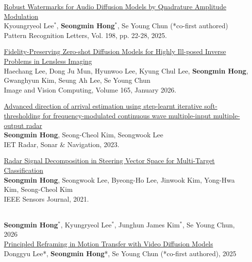 \begin{cvcontent}
\href{https://www.sciencedirect.com/science/article/pii/S0167865525003083}{Robust Watermarks for Audio Diffusion Models by Quadrature Amplitude Modulation}\\
Kyoungryeol Lee$^*$, \textbf{Seongmin Hong}$^*$, Se Young Chun (*co-first authored)\\
Pattern Recognition Letters, Vol. 198, pp. 22-28, 2025.

\href{https://doi.org/10.1016/j.imavis.2025.105786}{Fidelity-Preserving Zero-shot Diffusion Models for Highly Ill-posed Inverse Problems in Lensless Imaging}\\
Haechang Lee, Dong Ju Mun, Hyunwoo Lee, Kyung Chul Lee, \textbf{Seongmin Hong}, Gwanghyun Kim, Seung Ah Lee, Se Young Chun\\
Image and Vision Computing, Volume 165, January 2026.

\href{https://ietresearch.onlinelibrary.wiley.com/doi/10.1049/rsn2.12319}{Advanced direction of arrival estimation using step-learnt iterative soft-thresholding for frequency-modulated continuous wave multiple-input multiple-output radar}\\
\textbf{Seongmin Hong}, Seong-Cheol Kim, Seongwook Lee\\
IET Radar, Sonar \& Navigation, 2023.

\href{https://ieeexplore.ieee.org/abstract/document/9552897}{Radar Signal Decomposition in Steering Vector Space for Multi-Target Classification}\\
\textbf{Seongmin Hong}, Seongwook Lee, Byeong-Ho Lee, Jinwook Kim, Yong-Hwa Kim, Seong-Cheol Kim\\
IEEE Sensors Journal, 2021.

\end{cvcontent}
\begin{cvcontent}
     \\
    \textbf{Seongmin Hong}$^*$, Kyungryeol Lee$^*$, Junghun James Kim$^*$, Se Young Chun, 2026 \\

    \href{https://dx.doi.org/10.2139/ssrn.5397023}{Principled Reframing in Motion Transfer with Video Diffusion Models} \\
    Donggyu Lee*, \textbf{Seongmin Hong}*, Se Young Chun (*co-first authored), 2025 \\
\end{cvcontent}

